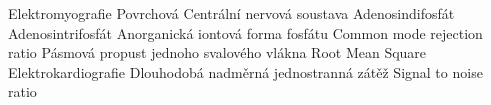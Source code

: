  {Elektromyografie}
 {Povrchová }
 {Centrální nervová soustava}
 {Adenosindifosfát}
 {Adenosintrifosfát}
 {Anorganická iontová forma fosfátu}
 {Common mode rejection ratio}
 {Pásmová propust}
 { jednoho svalového vlákna}
 {Root Mean Square}
 {Elektrokardiografie}
 {Dlouhodobá nadměrná jednostranná zátěž}
 {Signal to noise ratio}
